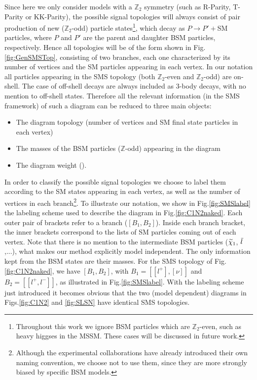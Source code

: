 Since here we only consider models with a $\mathbb{Z}_2$ symmetry (such as R-Parity, T-Parity or KK-Parity),
the possible signal topologies will always consist of 
pair production of new ($\mathbb{Z}_2$-odd) particle states\footnote{Throughout this work we 
ignore BSM particles which are $\mathbb{Z}_2$-even, such as heavy higgses in the MSSM. These
cases will be discussed in future work.},
which decay as $P \to P' + $SM particles,
where $P$ and $P'$ are the parent and daughter BSM particles, respectively.
Hence all topologies will be of the form shown in Fig.\ref{fig:GenSMSTop}, consisting of two branches, each one characterized by its number of vertices and the SM particles appearing in each vertex. 
In our notation all particles appearing in the SMS topology
 (both $\mathbb{Z}_2$-even and $\mathbb{Z}_2$-odd) are on-shell. 
The case of off-shell decays are always included as 3-body decays, with no mention to off-shell states.
Therefore all the relevant information (in the SMS framework) of such a diagram can be 
reduced to three main objects:
\begin{itemize}
\item The diagram topology (number of vertices and SM final state particles in each vertex)
\item The masses of the BSM particles ($\mathbb{Z}$-odd) appearing in the diagram
\item The diagram weight (\sigmaXBF).
\end{itemize}

In order to classify the possible signal topologies we choose to label them according to the
SM states appearing in each vertex, as well as the number of vertices in each branch\footnote{Although the experimental collaborations have already introduced their
own naming convention, we choose not to use them, since they are more strongly biased by specific
BSM models.}.
To illustrate our notation, we show in Fig.\ref{fig:SMSlabel} the labeling scheme used to describe the 
diagram in Fig.\ref{fig:C1N2naked}.
Each outer pair of brackets refer to a branch ($[B_1,B_2]$). 
Inside each branch bracket, the inner brackets
correspond to the lists of SM particles coming out of each vertex.
Note that there is no mention to the intermediate BSM particles ($\widetilde{\chi}_1$, $\tilde{l}$,...),
what makes our method explicitly model independent. The only information kept from the BSM states
are their masses. For the SMS topology of Fig.\ref{fig:C1N2naked}, we have $[B_1,B_2]$, with $B_1 = [[l^+],[\nu]]$ and $B_2 = [[l^+,l^-]]$, 
as illustrated in Fig.\ref{fig:SMSlabel}. With the labeling scheme just introduced it becomes obvious
that the two (model dependent) diagrams in Figs.\ref{fig:C1N2} and \ref{fig:SLSN} have identical SMS topologies.

